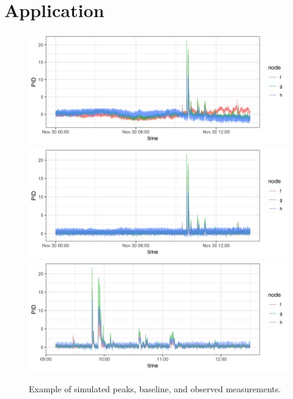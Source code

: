 \documentclass[12pt]{article}
\numberwithin{equation}{section}
\theoremstyle{plain}
\begin{document}
\section{Application}


\begin{figure}
	\caption{Example of simulated peaks, baseline, and observed measurements.}
	\includegraphics[width = \linewidth]{Figures/uncorrected_data.png}
	\includegraphics[width = \linewidth]{Figures/corrected_data.png}
	\includegraphics[width = \linewidth]{Figures/corrected_zoom_data.png}
\end{figure}

\pagebreak




\end{document}
